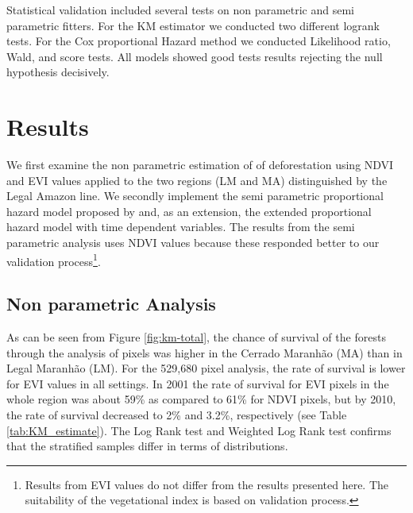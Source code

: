 Statistical validation included several tests on non parametric and semi parametric fitters. For the KM estimator we conducted two different logrank tests. For the Cox proportional Hazard method we conducted Likelihood ratio, Wald, and score tests. All models showed good tests results rejecting the null hypothesis decisively. 

\section{Results}  %
\label{S:3}
We first examine the non parametric estimation of \citet{kaplanandmeier} of deforestation using NDVI and EVI values applied to the two regions (LM and MA) distinguished by the Legal Amazon line.  We secondly implement the semi parametric proportional hazard model proposed by \citet{Cox1972} and, as an extension, the extended proportional hazard model with time dependent variables. The results from the semi parametric analysis uses NDVI values because these responded better to our validation process\footnote{Results from EVI values do not differ from the results presented here. The suitability of the vegetational index is based on validation process.}.


\subsection{Non parametric Analysis} \label{resultssection1}
As can be seen from Figure \ref{fig:km-total}, the chance of survival of the forests through the analysis of pixels was higher in the Cerrado Maranhão (MA) than in Legal Maranhão (LM). For the 529,680 pixel analysis, the rate of survival is lower for EVI values in all settings. In 2001 the rate of survival for EVI pixels in the whole region was about 59\% as compared to 61\% for NDVI pixels, but by  2010, the rate of survival decreased to 2\% and 3.2\%, respectively (see Table \ref{tab:KM_estimate}). The Log Rank test and Weighted Log Rank test confirms that the stratified samples differ in terms of distributions. 

